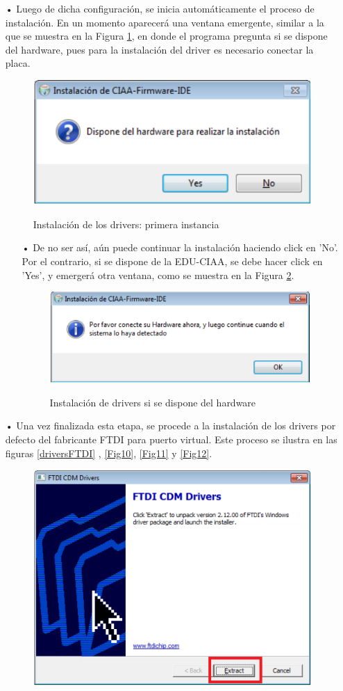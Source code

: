 \documentclass[12pt,letterpaper]{article}
\begin{document}
\begin{enumerate}
\item[•]Luego de dicha configuración, se inicia automáticamente el proceso de instalación. En un momento aparecerá una ventana emergente, similar a la que se muestra en la Figura \ref{Fig8}, en donde el programa pregunta si se dispone del hardware, pues para la instalación del driver es necesario conectar la placa.
\begin{figure}[!h]
\centering
\includegraphics[width=6 cm]{figuras/instalacion5.png}\\
\caption{Instalación de los drivers: primera instancia}
\label{Fig8}
\end{figure}
\begin{enumerate}
\item[•]De no  ser así, aún puede continuar la instalación haciendo click en 'No'. Por el contrario, si se dispone de la EDU-CIAA, se debe hacer click en 'Yes', y emergerá otra ventana, como se muestra en la Figura \ref{Fig9}.
\begin{figure}[!h]
\centering
\includegraphics[width=6 cm]{figuras/instalacion6.png}\\
\caption{Instalación de drivers si se dispone del hardware}
\label{Fig9}
\end{figure}
\end{enumerate}
\item[•]Una vez finalizada esta etapa, se procede a la instalación de los drivers por defecto del fabricante FTDI para puerto virtual. Este proceso se ilustra en las figuras \ref{driversFTDI} , \ref{Fig10}, \ref{Fig11} y \ref{Fig12}.
\begin{figure}[H]
\centering
\includegraphics[width=6 cm]{figuras/instalacion7.png}\\

\end{figure}
\end{enumerate}
\end{document}
